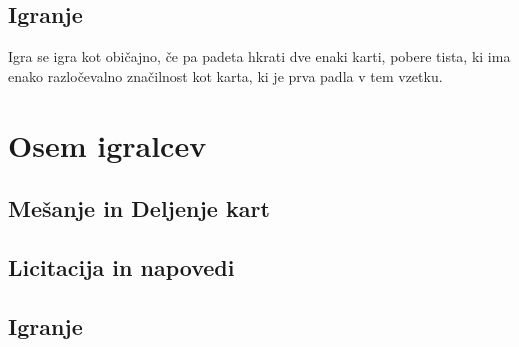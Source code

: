 \documentclass[a4paper, ]{report}
\begin{document}
\chapter{Igranje}

Igra se igra kot običajno, če pa padeta hkrati dve enaki karti, pobere tista, ki ima enako razločevalno značilnost kot karta, ki je prva padla v tem vzetku.

\part{Osem igralcev}

\chapter{Mešanje in Deljenje kart}
\chapter{Licitacija in napovedi}
\chapter{Igranje}
\end{document}
